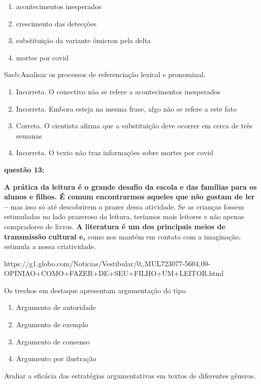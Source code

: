 {\begin{enumerate}
\def\labelenumi{\alph{enumi})}
\item
  acontecimentos inesperados
\item
  crescimento das detecções
\item
  substituição da variante ômicron pela delta
\item
  mortes por covid
\end{enumerate}

Saeb:Analisar os processos de referenciação lexical e pronominal.

\begin{enumerate}
\def\labelenumi{\arabic{enumi}.}
\item
  Incorreta. O conectivo não se refere a acontecimentos inesperados
\item
  Incorreta. Embora esteja na mesma frase, algo não se refere a este
  fato
\item
  Correta. O cientista afirma que a substituição deve ocorrer em cerca
  de três semanas
\item
  Incorreta. O texto não traz informações sobre mortes por covid
\end{enumerate}

\textbf{questão 13:}

\textbf{A prática da leitura é o grande desafio da escola e das famílias
para os alunos e filhos. É comum encontrarmos aqueles que não gostam de
ler --} mas isso só até descobrirem o prazer dessa atividade. Se as
crianças fossem estimuladas no lado prazeroso da leitura, teríamos mais
leitores e não apenas compradores de livros. \textbf{A literatura é um
dos principais meios de transmissão cultural e,} como nos mantém em
contato com a imaginação, estimula a nossa criatividade.

https://g1.globo.com/Noticias/Vestibular/0,,MUL723077-5604,00-OPINIAO+COMO+FAZER+DE+SEU+FILHO+UM+LEITOR.html

Os trechos em destaque apresentam argumentação do tipo

\begin{enumerate}
\def\labelenumi{\alph{enumi})}
\item
  Argumento de autoridade
\item
  Argumento de exemplo
\item
  Argumento de consenso
\item
  Argumento por ilustração
\end{enumerate}

Avaliar a eficácia das estratégias argumentativas em textos de
diferentes gêneros.

}
